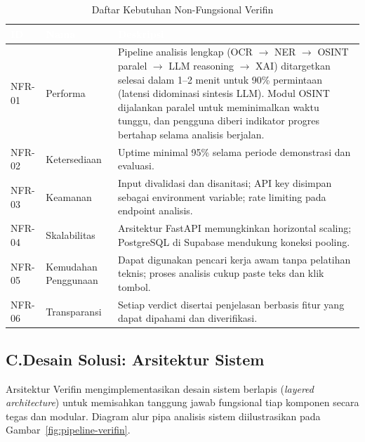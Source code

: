 \documentclass[12pt,a4paper]{article}
\newcommand{\thead}[1]{\textcolor{white}{\textbf{#1}}}
\begin{document}
\begin{adjustwidth}{0.50cm}{0pt}
\begin{table}[H]
\centering
\caption{Daftar Kebutuhan Non-Fungsional Verifin}
\label{tab:nfr-list}
\small
\begin{tabularx}{\linewidth}{@{}L{1.5cm}L{3.5cm}Y@{}}
\toprule
{}\thead{ID} & \thead{Nama} & \thead{Deskripsi} \\
\midrule
{}
NFR-01 & Performa & Pipeline analisis lengkap (OCR $\to$ NER $\to$ OSINT paralel $\to$ LLM reasoning $\to$ XAI) ditargetkan selesai dalam 1--2 menit untuk 90\% permintaan (latensi didominasi sintesis LLM). Modul OSINT dijalankan paralel untuk meminimalkan waktu tunggu, dan pengguna diberi indikator progres bertahap selama analisis berjalan. \\
NFR-02 & Ketersediaan & Uptime minimal 95\% selama periode demonstrasi dan evaluasi. \\
NFR-03 & Keamanan & Input divalidasi dan disanitasi; API key disimpan sebagai environment variable; rate limiting pada endpoint analisis. \\
NFR-04 & Skalabilitas & Arsitektur FastAPI memungkinkan horizontal scaling; PostgreSQL di Supabase mendukung koneksi pooling. \\
NFR-05 & Kemudahan Penggunaan & Dapat digunakan pencari kerja awam tanpa pelatihan teknis; proses analisis cukup paste teks dan klik tombol. \\
NFR-06 & Transparansi & Setiap verdict disertai penjelasan berbasis fitur yang dapat dipahami dan diverifikasi. \\
\bottomrule
\end{tabularx}
\end{table}
\end{adjustwidth}

\subsection*{C.\quad Desain Solusi: Arsitektur Sistem}

Arsitektur Verifin mengimplementasikan desain sistem berlapis (\textit{layered architecture})
untuk memisahkan tanggung jawab fungsional tiap komponen secara tegas dan modular. Diagram
alur pipa analisis sistem diilustrasikan pada Gambar~\ref{fig:pipeline-verifin}.

\vspace{0.1cm}
\end{document}
